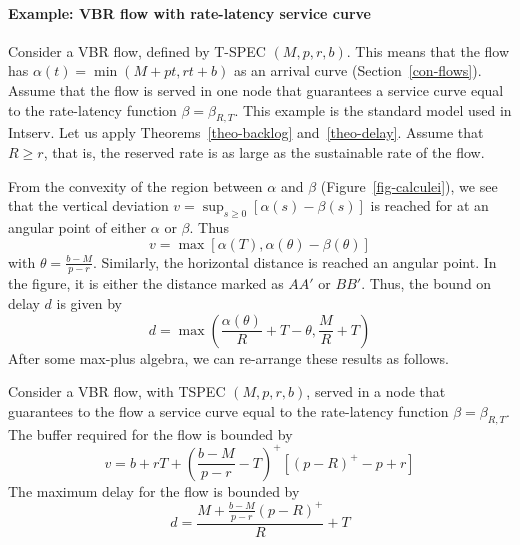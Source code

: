 \paragraph{Example: VBR flow with rate-latency service curve}
Consider a VBR flow, defined by T-SPEC $(M, p, r, b)$. This means
that the flow has $\alpha(t) = \min(M+pt, rt+b)$ as an arrival
curve (Section~\ref{con-flows}). Assume that the flow is served in
one node that guarantees a service curve equal to the rate-latency
function $\beta=\beta_{R,T}$. This example is the standard model
used in Intserv. Let us apply Theorems~\ref{theo-backlog}
and~\ref{theo-delay}.  Assume that $R \geq r$, that is, the
reserved rate is as large as the sustainable rate of the flow.

From the convexity of the region between $\alpha$ and $\beta$
(Figure~\ref{fig-calculei}), we see that the vertical deviation
$v=\sup_{s \geq 0}[\alpha(s)-\beta(s)]$ is reached for at an
angular point of either $\alpha$ or $\beta$. Thus
$$v = \max [\alpha(T), \alpha(\theta)-\beta(\theta)]
$$with $\theta =\frac{b-M}{p-r}$.
Similarly, the horizontal distance is reached an angular point. In
the figure, it is either the distance marked as $AA'$ or $BB'$.
Thus, the bound on delay $d$ is given by
$$d = \max \left( \frac{\alpha(\theta)}{R}+T-\theta, \frac{M}{R}+T \right)$$
After some max-plus algebra, we can re-arrange these results as
follows.
\begin{proposition}
Consider a VBR flow, with TSPEC $(M, p,
r, b)$, served in a node that guarantees to the flow a service
curve equal to the rate-latency function $\beta=\beta_{R,T}$. The
buffer required for the flow is bounded by
$$v=b + r T + \left(\frac{b-M}{p-r} - T\right)^+ [(p-R)^+ -p + r]
$$ The maximum delay for the flow is bounded by
$$d=\frac{M + \frac{b-M}{p-r}(p-R)^+ }{R} +T$$
\end{proposition}
\begin{figure}[htbp]
\end{figure}
